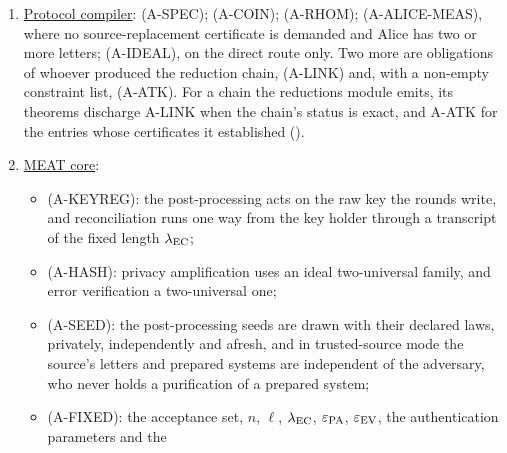 \begin{enumerate}[itemsep=2pt]
   (A-ALPHABET), an acceptance value recorded
  in every one of the $n$ rounds;  (A-HON-ENV),
  or  (A-HON) for a singleton set, which bear on
  completeness only; and  (A-REACH), that a
  feasible state produces statistics in the declared honest envelope (for a
  single declared law, that law), which no proof of secrecy uses but
  without which the declared devices do not describe the accepted statistics
  and a key length for them is not warranted.
\item \href{../modules/protocol-compiler/contract.pdf}{Protocol compiler}:
   (A-SPEC);
   (A-COIN);
   (A-RHOM);
   (A-ALICE-MEAS), where no
  source-replacement certificate is demanded and Alice has two or more
  letters;
   (A-IDEAL), on the direct route only. Two
  more are obligations of whoever produced the reduction chain,
   (A-LINK) and, with a non-empty constraint
  list,  (A-ATK). For a chain the reductions
  module emits, its theorems discharge A-LINK when the chain's status is exact,
  and A-ATK for the entries whose certificates it established
  ().
\item \href{../modules/meat-core/contract.pdf}{MEAT core}:
  \begin{itemize}[itemsep=1pt,leftmargin=1.2em]
  \item {} (A-KEYREG): the post-processing acts on
    the raw key the rounds write, and reconciliation runs one way from the
    key holder through a transcript of the fixed length $\lambda_{\mathrm{EC}}$;
  \item {} (A-HASH): privacy amplification uses an
    ideal two-universal family, and error verification a two-universal one;
  \item {} (A-SEED): the post-processing seeds are
    drawn with their declared laws, privately, independently and afresh, and
    in trusted-source mode the source's letters and prepared systems are
    independent of the adversary, who never holds a purification of a
    prepared system;
  \item {} (A-FIXED): the acceptance set, $n$,
    $\ell$, $\lambda_{\mathrm{EC}}$, $\varepsilon_{\mathrm{PA}}$, $\varepsilon_{\mathrm{EV}}$, the authentication parameters and the

\end{itemize}
\end{enumerate}
